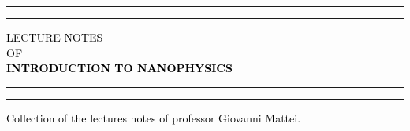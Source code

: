 



\begin{titlepage} %
	
	
	\centering %
	
	\scshape %
	
	\vspace*{\baselineskip} %
	
	
	\rule{\textwidth}{1.6pt}\vspace*{-\baselineskip}\vspace*{2pt} %
	\rule{\textwidth}{0.4pt} %
	
	\vspace{0.75\baselineskip} %
	
	\textcolor{black}{\large LECTURE NOTES\\ OF\\ \LARGE \textbf{INTRODUCTION TO NANOPHYSICS}\\} %
	
	\vspace{0.75\baselineskip} %
	
	\rule{\textwidth}{0.4pt}\vspace*{-\baselineskip}\vspace{3.2pt} %
	\rule{\textwidth}{1.6pt} %
	
	\vspace{2\baselineskip} %
	
	
	\textcolor{black}{Collection of the lectures notes of professor Giovanni Mattei.} %
	
	\vspace*{3\baselineskip} %
	

\end{titlepage}
